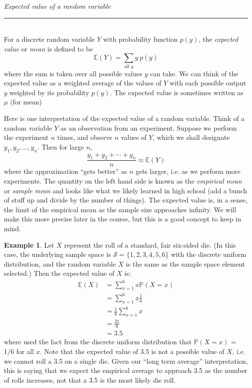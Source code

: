 \documentclass[12pt]{article}
\theoremstyle{definition}
\newtheorem*{example}{Example}
\theoremstyle{remark}
\def\P{{\mathbb P}}
\def\E{{\mathbb E}}
\def\cals{{\mathcal S}}
\begin{document}
\begin{framed}
  \emph{Expected value of a random variable}\\
  \rule{\dimexpr{}\fboxrule}{.1pt} \\
For a discrete random variable $Y$ with probability function $p(y)$, the \emph{expected value} or \emph{mean} is defined to be
\[
\E(Y) = \sum_{\text{all }y}y\:p(y)
\]
where the sum is taken over all possible values $y$ can take. We can think of the expected value as a weighted average of the values of $Y$ with each possible output $y$ weighted by its probability $p(y)$. The expected value is sometimes written as $\mu$ (for mean)
\end{framed}

Here is one interpretation of the expected value of a random variable. Think of a random variable $Y$ as an observation from an experiment. Suppose we perform the experiment $n$ times, and observe $n$ values of $Y$, which we shall designate $y_1, y_2, \dots, y_n$. Then for large $n$,
\[
\frac{y_1 + y_2 + \cdots + y_n}{n} \approx \E(Y)
\]
where the approximation ``gets better'' as $n$ gets larger, i.e. as we perform more experiments. The quantity on the left hand side is known as the \emph{empirical mean} or \emph{sample mean} and looks like what we likely learned in high school (add a bunch of stuff up and divide by the number of things). The expected value is, in a sense, the limit of the empirical mean as the sample size approaches infinity. We will make this more precise later in the course, but this is a good concept to keep in mind.

\begin{example}Let $X$ represent the roll of a standard, fair six-sided die. (In this case, the underlying sample space is $\cals = \{1, 2, 3, 4, 5, 6\}$ with the discrete uniform distribution, and the random variable $X$ is the same as the sample space element selected.) Then the expected value of $X$ is:
\begin{align*}
\E(X) &= \sum_{x = 1}^6 x \P(X = x) \\
&= \sum_{x = 1}^6 x \frac{1}{6} \\
&= \frac{1}{6 } \sum_{x = 1}^6 x \\
&= \frac{21}{6} \\
&= 3.5
\end{align*}
where used the fact from the discrete uniform distribution that $\P(X = x)$ = 1/6 for all $x$. Note that the expected value of 3.5 is not a possible value of $X$, i.e. we cannot roll a 3.5 on a single die. Given our ``long term average'' interpretation, this is saying that we expect the empirical average to approach 3.5 as the number of rolls increases, not that a 3.5 is the most likely die roll.
\end{example}
\end{document}

